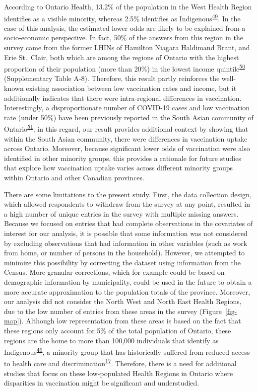 \documentclass[
  letterpaper,
  DIV=11,
  numbers=noendperiod]{scrartcl}
\begin{document}
According to Ontario Health, 13.2\% of the population in the West Health
Region identifies as a visible minority, whereas 2.5\% identifies as
Indigenous\textsuperscript{\protect\hyperlink{ref-ontariohealth}{49}}.
In the case of this analysis, the estimated lower odds are likely to be
explained from a socio-economic perspective. In fact, 50\% of the
answers from this region in the survey came from the former LHINs of
Hamilton Niagara Haldimand Brant, and Erie St.~Clair, both which are
among the regions of Ontario with the highest proportion of their
population (more than 20\%) in the lowest income
quintile\textsuperscript{\protect\hyperlink{ref-buajitti2018}{50}}
(Supplementary Table A-8). Therefore, this result partly reinforces the
well-known existing association between low vaccination rates and
income, but it additionally indicates that there were intra-regional
differences in vaccination. Interestingly, a disproportionate number of
COVID-19 cases and low vaccination rate (under 50\%) have been
previously reported in the South Asian community of
Ontario\textsuperscript{\protect\hyperlink{ref-anand2022}{51}}; in this
regard, our result provides additional context by showing that within
the South Asian community, there were differences in vaccination uptake
across Ontario. Moreover, because significant lower odds of vaccination
were also identified in other minority groups, this provides a rationale
for future studies that explore how vaccination uptake varies across
different minority groups within Ontario and other Canadian provinces.

There are some limitations to the present study. First, the data
collection design, which allowed respondents to withdraw from the survey
at any point, resulted in a high number of unique entries in the survey
with multiple missing answers. Because we focused on entries that had
complete observations in the covariates of interest for our analysis, it
is possible that some information was not considered by excluding
observations that had information in other variables (such as work from
home, or number of persons in the household). However, we attempted to
minimize this possibility by correcting the dataset using information
from the Census. More granular corrections, which for example could be
based on demographic information by municipality, could be used in the
future to obtain a more accurate approximation to the population totals
of the province. Moreover, our analysis did not consider the North West
and North East Health Regions, due to the low number of entries from
these areas in the survey (Figure~\ref{fig-map}). Although low
representation from these areas is based on the fact that these regions
only account for 5\% of the total population of Ontario, these regions
are the home to more than 100,000 individuals that identify as
Indigenous\textsuperscript{\protect\hyperlink{ref-ontariohealth}{49}}, a
minority group that has historically suffered from reduced access to
health care and
discrimination\textsuperscript{\protect\hyperlink{ref-mosby2021}{17}}.
Therefore, there is a need for additional studies that focus on these
low-populated Health Regions in Ontario where disparities in vaccination
might be significant and understudied.
\end{document}
